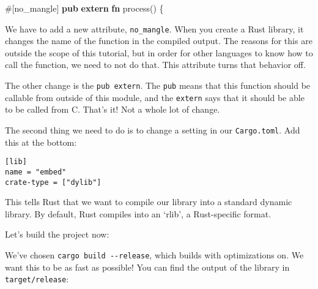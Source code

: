 \documentclass[a4paper,]{book}
\newenvironment{Shaded}{\begin{snugshade}}{\end{snugshade}}
\newcommand{\KeywordTok}[1]{\textcolor[rgb]{0.13,0.29,0.53}{\textbf{{#1}}}}
\newcommand{\OtherTok}[1]{\textcolor[rgb]{0.56,0.35,0.01}{{#1}}}
\newcommand{\NormalTok}[1]{{#1}}
\begin{document}
\begin{Shaded}
\begin{Highlighting}[]
\OtherTok{#[}\NormalTok{no_mangle}\OtherTok{]}
\KeywordTok{pub} \KeywordTok{extern} \KeywordTok{fn} \NormalTok{process() \{}
\end{Highlighting}
\end{Shaded}

We have to add a new attribute, \texttt{no\_mangle}. When you create a
Rust library, it changes the name of the function in the compiled
output. The reasons for this are outside the scope of this tutorial, but
in order for other languages to know how to call the function, we need
to not do that. This attribute turns that behavior off.

The other change is the \texttt{pub\ extern}. The \texttt{pub} means
that this function should be callable from outside of this module, and
the \texttt{extern} says that it should be able to be called from C.
That's it! Not a whole lot of change.

The second thing we need to do is to change a setting in our
\texttt{Cargo.toml}. Add this at the bottom:

\begin{verbatim}
[lib]
name = "embed"
crate-type = ["dylib"]
\end{verbatim}

This tells Rust that we want to compile our library into a standard
dynamic library. By default, Rust compiles into an `rlib', a
Rust-specific format.

Let's build the project now:

\begin{Shaded}
\end{Shaded}

We've chosen \texttt{cargo\ build\ -\/-release}, which builds with
optimizations on. We want this to be as fast as possible! You can find
the output of the library in \texttt{target/release}:

\begin{Shaded}
\end{Shaded}
\end{document}
